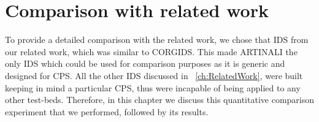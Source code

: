 
\chapter{Comparison with related work}
\label{ch:comparisonwithrelatedwork}

To provide a detailed comparison with the related work, we chose that \ac{IDS} from our related work, which was similar to \ac{CORGIDS}. This made ARTINALI the only \ac{IDS} which could be used for comparison purposes as it is generic and designed for \ac{CPS}. All the other \ac{IDS} discussed in ~\autoref{ch:RelatedWork}, were built keeping in mind a particular \ac{CPS}, thus were incapable of being applied to any other test-beds. Therefore, in this chapter we discuss this quantitative comparison experiment that we performed, followed by its results.

